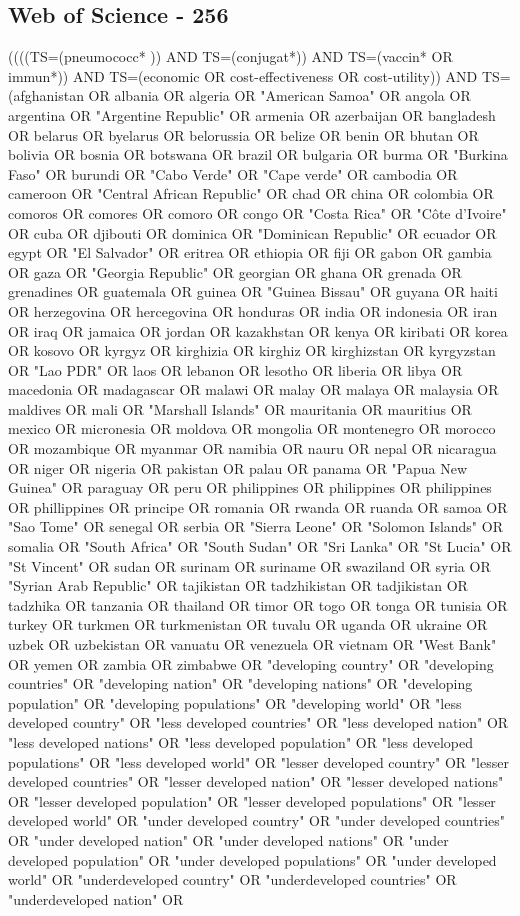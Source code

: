 \documentclass[12pt]{article}
\begin{document}
\subsection{Web of Science - 256}
((((TS=(pneumococc* )) AND TS=(conjugat*)) AND TS=(vaccin* OR immun*)) AND TS=(economic OR cost-effectiveness OR cost-utility)) AND TS=(afghanistan OR albania OR algeria OR "American Samoa" OR angola OR argentina OR "Argentine Republic" OR armenia OR azerbaijan OR bangladesh OR belarus OR byelarus OR belorussia OR belize OR benin OR bhutan OR bolivia OR bosnia OR botswana OR brazil OR bulgaria OR burma OR "Burkina Faso" OR burundi OR "Cabo Verde" OR "Cape verde" OR cambodia OR cameroon OR "Central African Republic" OR chad OR china OR colombia OR comoros OR comores OR comoro OR congo OR "Costa Rica" OR "Côte d'Ivoire" OR cuba OR djibouti OR dominica OR "Dominican Republic" OR ecuador OR egypt OR "El Salvador" OR eritrea OR ethiopia OR fiji OR gabon OR gambia OR gaza OR "Georgia Republic" OR georgian OR ghana OR grenada OR grenadines OR guatemala OR guinea OR "Guinea Bissau" OR guyana OR haiti OR herzegovina OR hercegovina OR honduras OR india OR indonesia OR iran OR iraq OR jamaica OR jordan OR kazakhstan OR kenya OR kiribati OR korea OR kosovo OR kyrgyz OR kirghizia OR kirghiz OR kirghizstan OR kyrgyzstan OR "Lao PDR" OR laos OR lebanon OR lesotho OR liberia OR libya OR macedonia OR madagascar OR malawi OR malay OR malaya OR malaysia OR maldives OR mali OR "Marshall Islands" OR mauritania OR mauritius OR mexico OR micronesia OR moldova OR mongolia OR montenegro OR morocco OR mozambique OR myanmar OR namibia OR nauru OR nepal OR nicaragua OR niger OR nigeria OR pakistan OR palau OR panama OR "Papua New Guinea" OR paraguay OR peru OR philippines OR philippines OR philippines OR phillippines OR principe OR romania OR rwanda OR ruanda OR samoa OR "Sao Tome" OR senegal OR serbia OR "Sierra Leone" OR "Solomon Islands" OR somalia OR "South Africa" OR "South Sudan" OR "Sri Lanka" OR "St Lucia" OR "St Vincent" OR sudan OR surinam OR suriname OR swaziland OR syria OR "Syrian Arab Republic" OR tajikistan OR tadzhikistan OR tadjikistan OR tadzhika OR tanzania OR thailand OR timor OR togo OR tonga OR tunisia OR turkey OR turkmen OR turkmenistan OR tuvalu OR uganda OR ukraine OR uzbek OR uzbekistan OR vanuatu OR venezuela OR vietnam OR "West Bank" OR yemen OR zambia OR zimbabwe OR "developing country" OR "developing countries" OR "developing nation" OR "developing nations" OR "developing population" OR "developing populations" OR "developing world" OR "less developed country" OR "less developed countries" OR "less developed nation" OR "less developed nations" OR "less developed population" OR "less developed populations" OR "less developed world" OR "lesser developed country" OR "lesser developed countries" OR "lesser developed nation" OR "lesser developed nations" OR "lesser developed population" OR "lesser developed populations" OR "lesser developed world" OR "under developed country" OR "under developed countries" OR "under developed nation" OR "under developed nations" OR "under developed population" OR "under developed populations" OR "under developed world" OR "underdeveloped country" OR "underdeveloped countries" OR "underdeveloped nation" OR 
\end{document}
